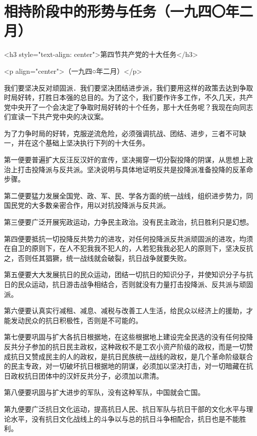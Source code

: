 \section[相持阶段中的形势与任务（一九四〇年二月）]{相持阶段中的形势与任务（一九四〇年二月）}


<h3 style="text-align: center">第四节共产党的十大任务</h3>

<p align="center">（一九四○年二月）</p>


我们要坚决反对顽固派．我们要坚决团结进步派，我们要用这样的政策去达到争取时局好转，打胜日本强的总目的。为了这个，我们要作许多工作，不久几天，共产党中央开了一个会决定了争取时局好转的十个任务，那十大任务呢？我现在向同志们宣读一下共产党中央的决议案。

为了力争时局的好转，克服逆流危险，必须强调抗战、团结、进步，三者不可缺一，并在这个基础上坚决执行下列的十大任务。

第一便要普遍扩大反汪反汉奸的宣传，坚决揭穿一切分裂投降的阴谋，从思想上政治上打击投降派与反共派。坚决说明与具体地证明反共是投降派准备投降的反革命步骤。

第二便要猛力发展全国党、政、军、民、学各方面的统一战线，组织进步势力，同国民党的大多数亲密合作，用以对抗投降派与反共派。

第三便要广泛开展宪政运动，力争民主政治。没有民主政治，抗日胜利只是幻想。

第四便要抵抗一切投降反共势力的进攻，对任何投降派反共派顽固派的进攻，均须在自卫的原则下，在人不犯我我不犯人的，人若犯我我必犯人的原则下，坚决反抗之，否则任其猖獗，统一战线就会破裂，抗日战争就要失败。

第五便要大大发展抗日的民众运动，团结一切抗日的知识分子，并使知识分子与抗日的民众运动，抗日游击战争相结合，否则就没有力量打击投降派、反共派与顽固派。

第六便要认真实行减租、减息、减税与改善工人生活，给民众以经济上的援助，才能发动民众的抗日积极性，否则是不可能的。

第七便要巩固与扩大各抗日根据地，在这些根据地上建设完全民选的没有任何投降反共分子参加的抗日民主政权，这种政权不是工农小资产阶级的政权，而是一切赞成抗日又赞成民主的人的政权，是抗日民族统一战线的政权，是几个革命阶级联合的民主专政，对一切破坏抗日根据地的阴谋，必须加以坚决打击，对一切暗藏在抗日政权抗日团体中的汉奸反共分子，必须加以肃清。

第八便要巩固与扩大进步的军队，没有这种军队，中国就会亡国。

第九便要广泛抗日文化运动，提高抗日人民、抗日军队与抗日干部的文化水平与理论水平，没有抗日文化战线上的斗争以与总的抗日斗争相配合，抗日也是不能胜利。

